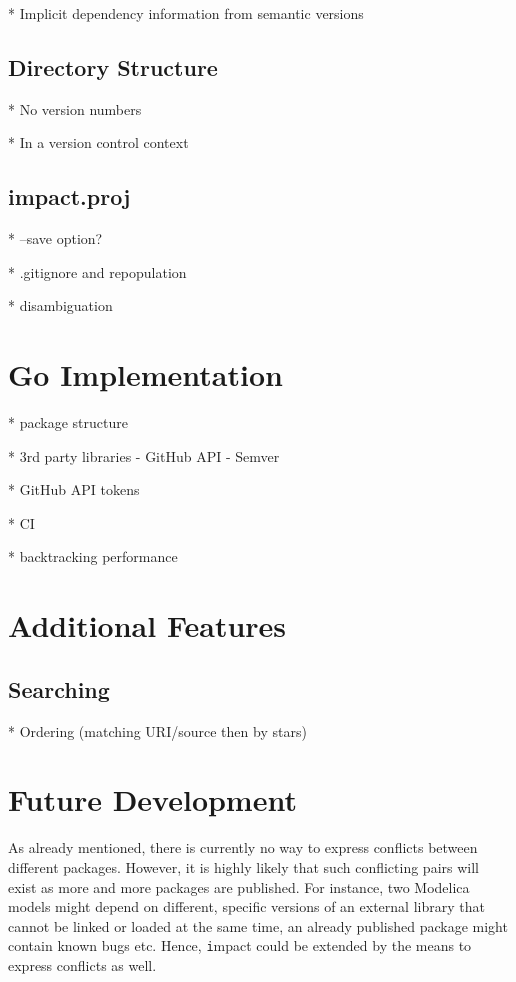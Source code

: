 \documentclass[11pt,a4paper,twocolumn]{article}
\newcommand{\code}[1]{\texttt{#1}} %
\begin{document}
* Implicit dependency information from semantic versions

\subsection{Directory Structure}

* No version numbers

* In a version control context

\subsection{impact.proj}

* --save option?

* .gitignore and repopulation

* disambiguation

\section{Go Implementation}

* package structure

* 3rd party libraries
  - GitHub API
  - Semver

* GitHub API tokens

* CI

* backtracking performance

\section{Additional Features}

\subsection{Searching}

* Ordering (matching URI/source then by stars)  

\section{Future Development}

As already mentioned, there is currently no way to express conflicts
between different packages.  However, it is highly likely that such
conflicting pairs will exist as more and more packages are published.
For instance, two Modelica models might depend on different, specific
versions of an external library that cannot be linked or loaded at the
same time, an already published package might contain known bugs etc.
Hence, {\code impact} could be extended by the means to express
conflicts as well.
\end{document}

